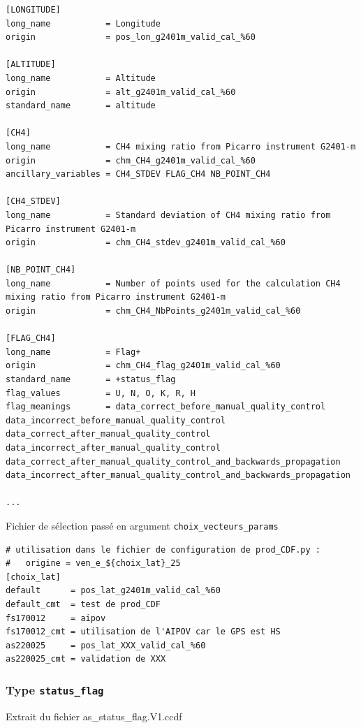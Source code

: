 \begin{landscape}
\begin{Verbatim}[fontsize=\myfontsize, commandchars=\\\{\}]
[LONGITUDE]
long_name           = Longitude
origin              = pos_lon_g2401m_valid_cal_%60

[ALTITUDE]
long_name           = Altitude
origin              = alt_g2401m_valid_cal_%60
standard_name       = altitude

[CH4]
long_name           = CH4 mixing ratio from Picarro instrument G2401-m
origin              = chm_CH4_g2401m_valid_cal_%60
ancillary_variables = CH4_STDEV FLAG_CH4 NB_POINT_CH4

[CH4_STDEV]
long_name           = Standard deviation of CH4 mixing ratio from Picarro instrument G2401-m
origin              = chm_CH4_stdev_g2401m_valid_cal_%60

[NB_POINT_CH4]
long_name           = Number of points used for the calculation CH4 mixing ratio from Picarro instrument G2401-m
origin              = chm_CH4_NbPoints_g2401m_valid_cal_%60

[FLAG_CH4]
long_name           = Flag+
origin              = chm_CH4_flag_g2401m_valid_cal_%60
standard_name       = +status_flag
flag_values         = U, N, O, K, R, H
flag_meanings       = data_correct_before_manual_quality_control data_incorrect_before_manual_quality_control data_correct_after_manual_quality_control data_incorrect_after_manual_quality_control data_correct_after_manual_quality_control_and_backwards_propagation data_incorrect_after_manual_quality_control_and_backwards_propagation

...
\end{Verbatim}


Fichier de sélection passé en argument \texttt{choix\_vecteurs\_params}

\begin{Verbatim}[fontsize=\myfontsize, commandchars=\\\{\}]
# utilisation dans le fichier de configuration de prod_CDF.py :
#   origine = ven_e_${choix_lat}_25
[choix_lat]
default      = pos_lat_g2401m_valid_cal_%60
default_cmt  = test de prod_CDF
fs170012     = aipov
fs170012_cmt = utilisation de l'AIPOV car le GPS est HS
as220025     = pos_lat_XXX_valid_cal_%60
as220025_cmt = validation de XXX
\end{Verbatim}

\subsubsection{Type \texttt{status\_flag}}

Extrait du fichier as\_status\_flag.V1.ccdf


\end{landscape}
